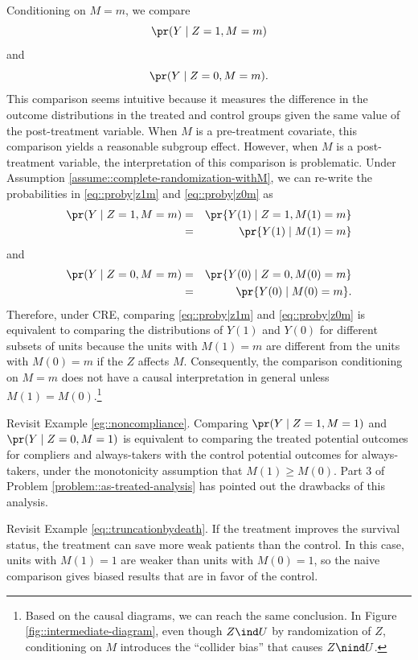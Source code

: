  
Conditioning on $M= m$, we compare
\begin{equation}
\pr(Y\mid Z=1, M=m)\label{eq::proby|z1m}
\end{equation}
and
\begin{equation}
\pr(Y\mid Z=0, M=m).\label{eq::proby|z0m}
\end{equation}
This comparison seems intuitive because it measures the difference in the outcome distributions in the treated and control groups given the same value of the post-treatment variable. When $M$ is a pre-treatment covariate, this comparison yields a reasonable subgroup effect. However, when $M$ is a post-treatment variable, the interpretation of this comparison is problematic. Under Assumption \ref{assume::complete-randomization-withM}, we can re-write the probabilities in \eqref{eq::proby|z1m} and \eqref{eq::proby|z0m} as 
\begin{eqnarray*}
\pr(Y\mid Z=1, M=m)  &=& \pr\{ Y(1)\mid Z=1, M(1) = m  \} \\
&=& \pr\{ Y(1)\mid   M(1) = m  \}
\end{eqnarray*}
and
\begin{eqnarray*}
\pr(Y\mid Z=0, M=m) &=&  \pr\{ Y(0)\mid Z=0, M(0) = m  \} \\
&=& \pr\{ Y(0)\mid   M(0) = m  \} . 
\end{eqnarray*}
Therefore, under CRE, comparing \eqref{eq::proby|z1m} and \eqref{eq::proby|z0m} is equivalent to comparing the distributions of $Y(1)$ and $Y(0)$ for different subsets of units because the units with $M(1) = m$ are different from the units with $M(0) = m$ if the $Z$ affects $M$. Consequently, the comparison conditioning on $M=m$ does not have a causal interpretation in general unless $M(1) = M(0)$.\footnote{Based on the causal diagrams, we can reach the same conclusion.
In Figure \ref{fig::intermediate-diagram}, even though $Z\ind U$ by randomization of $Z$, conditioning on $M$ introduces the ``collider bias'' that causes $Z\nind U$. 
} 


Revisit Example \ref{eg::noncompliance}. Comparing $\pr(Y\mid Z=1, M=1)$ and $\pr(Y\mid Z=0, M=1)$ is equivalent to comparing the treated potential outcomes for compliers and always-takers with the control potential outcomes for always-takers, under the monotonicity assumption that $M(1) \geq M(0)$. Part 3 of Problem \ref{problem::as-treated-analysis} has pointed out the drawbacks of this analysis. 


Revisit Example \ref{eq::truncationbydeath}. If the treatment improves the survival status, the treatment can save more weak patients than the control. In this case, units with $M(1)=1$ are weaker than units with $M(0)=1$, so the naive comparison gives biased results that are in favor of the control. 

